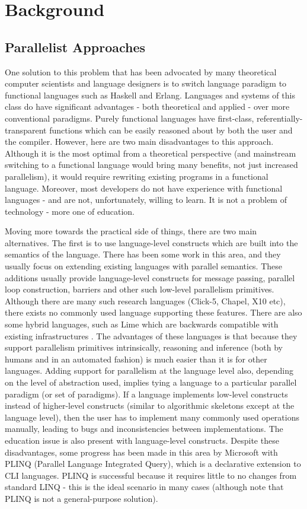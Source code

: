 \chapter{Background} \label{chp:background}
\section{Parallelist Approaches} \label{sec:background/approaches}
One solution to this problem that has been advocated by many theoretical computer scientists and language designers is to switch language paradigm to functional languages such as Haskell and Erlang. Languages and systems of this class do have significant advantages - both theoretical and applied - over more conventional paradigms. Purely functional languages have first-class, referentially-transparent functions which can be easily reasoned about by both the user and the compiler. However, here are two main disadvantages to this approach. Although it is the most optimal from a theoretical perspective (and mainstream switching to a functional language would bring many benefits, not just increased parallelism), it would require rewriting existing programs in a functional language. Moreover, most developers do not have experience with functional languages - and are not, unfortunately, willing to learn. It is not a problem of technology - more one of education.

Moving more towards the practical side of things, there are two main alternatives. The first is to use language-level constructs which are built into the semantics of the language. There has been some work in this area, and they usually focus on extending existing languages with parallel semantics. These additions usually provide language-level constructs for message passing, parallel loop construction, barriers and other such low-level parallelism primitives. Although there are many such research languages (Click-5, Chapel, X10 etc), there exists no commonly used language supporting these features. There are also some hybrid languages, such as Lime which are backwards compatible with existing infrastructures \citep{Dubach2012}. The advantages of these languages is that because they support parallelism primitives intrinsically, reasoning and inference (both by humans and in an automated fashion) is much easier than it is for other languages. Adding support for parallelism at the language level also, depending on the level of abstraction used, implies tying a language to a particular parallel paradigm (or set of paradigms). If a language implements low-level constructs instead of higher-level constructs (similar to algorithmic skeletons except at the language level), then the user has to implement many commonly used operations manually, leading to bugs and inconsistencies between implementations. The education issue is also present with language-level constructs. Despite these disadvantages, some progress has been made in this area by Microsoft with PLINQ (Parallel Language Integrated Query), which is a declarative extension to CLI languages. PLINQ is successful because it requires little to no changes from standard LINQ - this is the ideal scenario in many cases (although note that PLINQ is not a general-purpose solution).

